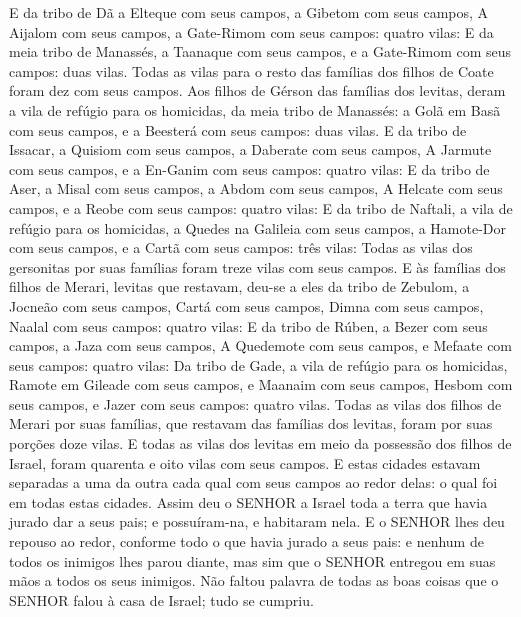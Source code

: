 {E da tribo de Dã a Elteque com seus campos, a Gibetom com seus campos,
A Aijalom com seus campos, a Gate-Rimom com seus campos: quatro vilas:
E da meia tribo de Manassés, a Taanaque com seus campos, e a Gate-Rimom com seus campos: duas vilas.
Todas as vilas para o resto das famílias dos filhos de Coate foram dez com seus campos.
Aos filhos de Gérson das famílias dos levitas, deram a vila de refúgio para os homicidas, da meia tribo de Manassés: a Golã em Basã com seus campos, e a Beesterá com seus campos: duas vilas.
E da tribo de Issacar, a Quisiom com seus campos, a Daberate com seus campos,
A Jarmute com seus campos, e a En-Ganim com seus campos: quatro vilas:
E da tribo de Aser, a Misal com seus campos, a Abdom com seus campos,
A Helcate com seus campos, e a Reobe com seus campos: quatro vilas:
E da tribo de Naftali, a vila de refúgio para os homicidas, a Quedes na Galileia com seus campos, a Hamote-Dor com seus campos, e a Cartã com seus campos: três vilas:
Todas as vilas dos gersonitas por suas famílias foram treze vilas com seus campos.
E às famílias dos filhos de Merari, levitas que restavam, deu-se a eles da tribo de Zebulom, a Jocneão com seus campos, Cartá com seus campos,
Dimna com seus campos, Naalal com seus campos: quatro vilas:
E da tribo de Rúben, a Bezer com seus campos, a Jaza com seus campos,
A Quedemote com seus campos, e Mefaate com seus campos: quatro vilas:
Da tribo de Gade, a vila de refúgio para os homicidas, Ramote em Gileade com seus campos, e Maanaim com seus campos,
Hesbom com seus campos, e Jazer com seus campos: quatro vilas.
Todas as vilas dos filhos de Merari por suas famílias, que restavam das famílias dos levitas, foram por suas porções doze vilas.
E todas as vilas dos levitas em meio da possessão dos filhos de Israel, foram quarenta e oito vilas com seus campos.
E estas cidades estavam separadas a uma da outra cada qual com seus campos ao redor delas: o qual foi em todas estas cidades.
Assim deu o SENHOR a Israel toda a terra que havia jurado dar a seus pais; e possuíram-na, e habitaram nela.
E o SENHOR lhes deu repouso ao redor, conforme todo o que havia jurado a seus pais: e nenhum de todos os inimigos lhes parou diante, mas sim que o SENHOR entregou em suas mãos a todos os seus inimigos.
Não faltou palavra de todas as boas coisas que o SENHOR falou à casa de Israel; tudo se cumpriu.

\par }

